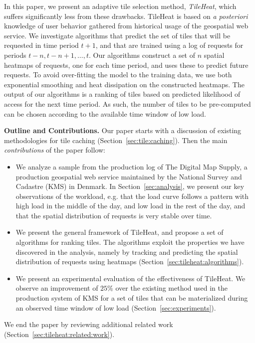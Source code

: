 \documentclass[11pt, oneside]{report}
\newcommand{\minisec}[1]{\noindent\textbf{#1.}}
\begin{document}
In this paper, we present an adaptive tile selection method, \emph{TileHeat}, which suffers significantly less from these drawbacks. TileHeat is based on  \emph{a posteriori} knowledge of user behavior gathered from historical usage of the geospatial web service. We investigate algorithms that predict the set of tiles that will be requested in time period $t + 1$, and that are trained using a log of requests for periods $t-n, t -n + 1, \ldots, t$. Our algorithms construct a set of $n$ spatial heatmaps of requests, one for each time period, and uses these to predict future requests. To avoid over-fitting the model to the training data, we use both exponential smoothing and heat dissipation on the constructed heatmaps. The output of our algorithms is a ranking of tiles based on predicted likelihood of access for the next time period. As such, the number of tiles to be pre-computed can be chosen according to the available time window of low load.	

\minisec{Outline and Contributions}
Our paper starts with a discussion of existing methodologies for tile caching (Section~\ref{sec:tile:caching}). Then the main \emph{contributions} of the paper follow:
%
\begin{itemize}

\item We analyze a sample from the production log of The Digital Map Supply, a production geospatial web service maintained by the National Survey and Cadastre (KMS) in Denmark. In Section~\ref{sec:analysis}, we present our key observations of the workload, e.g. that the load curve follows a pattern with high load in the middle of the day, and low load in the rest of the day, and that the spatial distribution of requests is very stable over time.

\item We present the general framework of TileHeat, and propose a set of algorithms for ranking tiles. The algorithms exploit the properties we have discovered in the analysis, namely by tracking and predicting the spatial distribution of requests using heatmaps (Section~\ref{sec:tileheat:algorithms}).

\item We present an experimental evaluation of the effectiveness of TileHeat. We observe an improvement of $25\%$ over the existing method used in the production system of KMS  for a set of tiles that can be materialized during an observed time window of low load (Section~\ref{sec:experiments}).

\end{itemize}
%
We end the paper by reviewing additional related work (Section~\ref{sec:tileheat:related:work}). 
\end{document}
